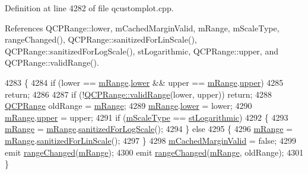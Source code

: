 Definition at line 4282 of file qcustomplot.\+cpp.



References Q\+C\+P\+Range\+::lower, m\+Cached\+Margin\+Valid, m\+Range, m\+Scale\+Type, range\+Changed(), Q\+C\+P\+Range\+::sanitized\+For\+Lin\+Scale(), Q\+C\+P\+Range\+::sanitized\+For\+Log\+Scale(), st\+Logarithmic, Q\+C\+P\+Range\+::upper, and Q\+C\+P\+Range\+::valid\+Range().


\begin{DoxyCode}
4283 \{
4284   \textcolor{keywordflow}{if} (lower == \hyperlink{class_q_c_p_axis_a1ee36773c49062d751560e11f90845f7}{mRange}.\hyperlink{class_q_c_p_range_aa3aca3edb14f7ca0c85d912647b91745}{lower} && upper == \hyperlink{class_q_c_p_axis_a1ee36773c49062d751560e11f90845f7}{mRange}.\hyperlink{class_q_c_p_range_ae44eb3aafe1d0e2ed34b499b6d2e074f}{upper})
4285     \textcolor{keywordflow}{return};
4286   
4287   \textcolor{keywordflow}{if} (!\hyperlink{class_q_c_p_range_ab38bd4841c77c7bb86c9eea0f142dcc0}{QCPRange::validRange}(lower, upper)) \textcolor{keywordflow}{return};
4288   \hyperlink{class_q_c_p_range}{QCPRange} oldRange = \hyperlink{class_q_c_p_axis_a1ee36773c49062d751560e11f90845f7}{mRange};
4289   \hyperlink{class_q_c_p_axis_a1ee36773c49062d751560e11f90845f7}{mRange}.\hyperlink{class_q_c_p_range_aa3aca3edb14f7ca0c85d912647b91745}{lower} = lower;
4290   \hyperlink{class_q_c_p_axis_a1ee36773c49062d751560e11f90845f7}{mRange}.\hyperlink{class_q_c_p_range_ae44eb3aafe1d0e2ed34b499b6d2e074f}{upper} = upper;
4291   \textcolor{keywordflow}{if} (\hyperlink{class_q_c_p_axis_ad706039549cbbbec5fcb2baf7894e04d}{mScaleType} == \hyperlink{class_q_c_p_axis_a36d8e8658dbaa179bf2aeb973db2d6f0abf5b785ad976618816dc6f79b73216d4}{stLogarithmic})
4292   \{
4293     \hyperlink{class_q_c_p_axis_a1ee36773c49062d751560e11f90845f7}{mRange} = \hyperlink{class_q_c_p_axis_a1ee36773c49062d751560e11f90845f7}{mRange}.\hyperlink{class_q_c_p_range_aaf6a9046e78d91eeb8e89584fe46b034}{sanitizedForLogScale}();
4294   \} \textcolor{keywordflow}{else}
4295   \{
4296     \hyperlink{class_q_c_p_axis_a1ee36773c49062d751560e11f90845f7}{mRange} = \hyperlink{class_q_c_p_axis_a1ee36773c49062d751560e11f90845f7}{mRange}.\hyperlink{class_q_c_p_range_a1ff029704c29a75adbc1dc36cecaf44c}{sanitizedForLinScale}();
4297   \}
4298   \hyperlink{class_q_c_p_axis_a2cde37b6e385f47e11322df4ac1b0e9b}{mCachedMarginValid} = \textcolor{keyword}{false};
4299   emit \hyperlink{class_q_c_p_axis_a0894084e4c16a1736534c4095746f910}{rangeChanged}(\hyperlink{class_q_c_p_axis_a1ee36773c49062d751560e11f90845f7}{mRange});
4300   emit \hyperlink{class_q_c_p_axis_a0894084e4c16a1736534c4095746f910}{rangeChanged}(\hyperlink{class_q_c_p_axis_a1ee36773c49062d751560e11f90845f7}{mRange}, oldRange);
4301 \}
\end{DoxyCode}


